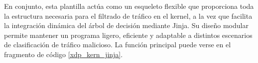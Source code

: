 En conjunto, esta plantilla actúa como un esqueleto flexible que proporciona toda la estructura necesaria para el filtrado de tráfico en el kernel, a la vez que facilita la integración dinámica del árbol de decisión mediante Jinja. Su diseño modular permite mantener un programa ligero, eficiente y adaptable a distintos escenarios de clasificación de tráfico malicioso. La función principal puede verse en el fragmento de código \ref{xdp_kern_jinja}.

